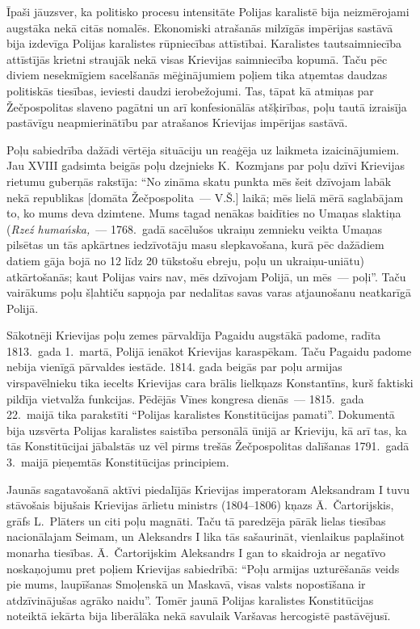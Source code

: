 \documentclass[twoside,a5paper,12pt,fleqn,openany]{extbook}
\newcommand{\pltxti}[1]{\textit{\textpolish{#1}}}
\begin{document}
Īpaši jāuzsver, ka politisko procesu intensitāte Polijas karalistē bija neizmērojami augstāka nekā citās nomalēs. Ekonomiski atrašanās milzīgās impērijas sastāvā bija izdevīga Polijas karalistes rūpniecības attīstībai. Karalistes tautsaimniecība attīstījās krietni straujāk nekā visas Krievijas saimniecība kopumā. Taču pēc diviem nesekmīgiem sacelšanās mēģinājumiem poļiem tika atņemtas daudzas politiskās tiesības, ieviesti daudzi ierobežojumi. Tas, tāpat kā atmiņas par Žečpospolitas slaveno pagātni un arī konfesionālās atšķirības, poļu tautā izraisīja pastāvīgu neapmierinātību par atrašanos Krievijas impērijas sastāvā.

Poļu sabiedrība dažādi vērtēja situāciju un reaģēja uz laikmeta izaicinājumiem. Jau XVIII gadsimta beigās poļu dzejnieks K.~Kozmjans par poļu dzīvi Krievijas rietumu guberņās rakstīja: ``No zināma skatu punkta mēs šeit dzīvojam labāk nekā republikas [domāta Žečpospolita~--- V.Š.] laikā; mēs lielā mērā saglabājam to, ko mums deva dzimtene. Mums tagad nenākas baidīties no Umaņas slaktiņa (\pltxti{Rzeź humańska,}~--- 1768.~gadā sacēlušos ukraiņu zemnieku veikta Umaņas pilsētas un tās apkārtnes iedzīvotāju masu slepkavošana, kurā pēc dažādiem datiem gāja bojā no 12 līdz 20 tūkstošu ebreju, poļu un ukraiņu-uniātu) atkārtošanās; kaut Polijas vairs nav, mēs dzīvojam Polijā, un mēs~--- poļi''. Taču vairākums poļu šļahtiču sapņoja par nedalītas savas varas atjaunošanu neatkarīgā Polijā.

Sākotnēji Krievijas poļu zemes pārvaldīja Pagaidu augstākā padome, radīta 1813.~gada 1.~martā, Polijā ienākot Krievijas karaspēkam. Taču Pagaidu padome nebija vienīgā pārvaldes iestāde. 1814. gada beigās par poļu armijas virspavēlnieku tika iecelts Krievijas cara brālis lielkņazs Konstantīns, kurš faktiski pildīja vietvalža funkcijas. Pēdējās Vīnes kongresa dienās~--- 1815.~gada 22.~maijā tika parakstīti ``Polijas karalistes Konstitūcijas pamati''. Dokumentā bija uzsvērta Polijas karalistes saistība personālā ūnijā ar Krieviju, kā arī tas, ka tās Konstitūcijai jābalstās uz vēl pirms trešās Žečpospolitas dalīšanas 1791.~gadā 3.~maijā pieņemtās Konstitūcijas principiem.

Jaunās  sagatavošanā aktīvi piedalījās Krievijas imperatoram Aleksandram I tuvu stāvošais bijušais Krievijas ārlietu ministrs (1804--1806) kņazs Ā.~Čartorijskis, grāfs L.~Plāters un citi poļu magnāti. Taču tā paredzēja pārāk lielas tiesības nacionālajam Seimam, un Aleksandrs I lika tās sašaurināt, vienlaikus paplašinot monarha tiesības. Ā.~Čartorijskim Aleksandrs I gan to skaidroja ar negatīvo noskaņojumu pret poļiem Krievijas sabiedrībā: ``Poļu armijas uzturēšanās veids pie mums, laupīšanas Smoļenskā un Maskavā, visas valsts nopostīšana ir atdzīvinājušas agrāko naidu''. Tomēr jaunā Polijas karalistes Konstitūcijas noteiktā iekārta bija liberālāka nekā savulaik Varšavas hercogistē pastāvējusī.
\end{document}

